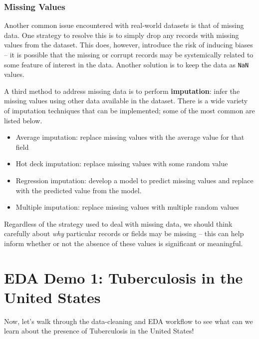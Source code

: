 \documentclass[
  letterpaper,
  DIV=11,
  numbers=noendperiod]{scrreprt}
\providecommand{\tightlist}{%
  \setlength{\itemsep}{0pt}\setlength{\parskip}{0pt}}\usepackage{longtable,booktabs,array}
\begin{document}
\hypertarget{missing-values}{%
\subsection{Missing Values}\label{missing-values}}

Another common issue encountered with real-world datasets is that of
missing data. One strategy to resolve this is to simply drop any records
with missing values from the dataset. This does, however, introduce the
risk of inducing biases -- it is possible that the missing or corrupt
records may be systemically related to some feature of interest in the
data. Another solution is to keep the data as \texttt{NaN} values.

A third method to address missing data is to perform
\textbf{imputation}: infer the missing values using other data available
in the dataset. There is a wide variety of imputation techniques that
can be implemented; some of the most common are listed below.

\begin{itemize}
\tightlist
\item
  Average imputation: replace missing values with the average value for
  that field
\item
  Hot deck imputation: replace missing values with some random value
\item
  Regression imputation: develop a model to predict missing values and
  replace with the predicted value from the model.
\item
  Multiple imputation: replace missing values with multiple random
  values
\end{itemize}

Regardless of the strategy used to deal with missing data, we should
think carefully about \emph{why} particular records or fields may be
missing -- this can help inform whether or not the absence of these
values is significant or meaningful.


\hypertarget{eda-demo-1-tuberculosis-in-the-united-states}{%
\chapter{EDA Demo 1: Tuberculosis in the United
States}\label{eda-demo-1-tuberculosis-in-the-united-states}}

Now, let's walk through the data-cleaning and EDA workflow to see what
can we learn about the presence of Tuberculosis in the United States!
\end{document}
